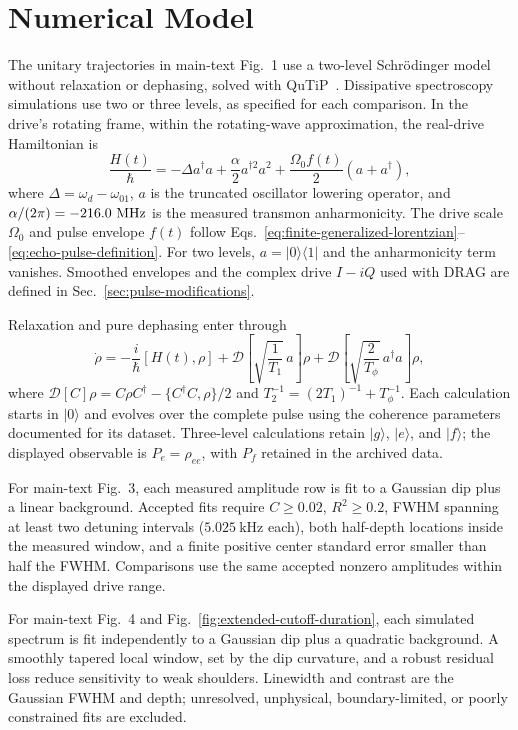 \section{Numerical Model}
\label{sec:numerical-model}

The unitary trajectories in main-text Fig.~1 use a two-level
Schr\"odinger model without relaxation or dephasing, solved with
QuTiP~\cite{johansson_qutip2_2013}. Dissipative spectroscopy simulations
use two or three levels, as specified for each comparison.
In the drive's rotating frame, within the rotating-wave approximation,
the real-drive Hamiltonian is~\cite{PhysRevA.76.042319}
\begin{equation}
    \frac{H(t)}{\hbar}
    = -\Delta a^\dagger a
    + \frac{\alpha}{2}a^{\dagger 2}a^2
    + \frac{\Omega_0 f(t)}{2}(a+a^\dagger),
    \label{eq:numerical-hamiltonian}
\end{equation}
where $\Delta=\omega_d-\omega_{01}$, $a$ is the truncated oscillator
lowering operator, and $\alpha/(2\pi)=-216.0~\mathrm{MHz}$
is the measured transmon anharmonicity. The drive scale $\Omega_0$ and
pulse envelope $f(t)$ follow
Eqs.~\eqref{eq:finite-generalized-lorentzian}--\eqref{eq:echo-pulse-definition}.
For two levels, $a=|0\rangle\langle1|$ and the anharmonicity term vanishes.
Smoothed envelopes and the complex drive $I-iQ$ used with DRAG are defined
in Sec.~\ref{sec:pulse-modifications}.

Relaxation and pure dephasing enter through
\begin{equation}
    \dot{\rho}
    = -\frac{i}{\hbar}[H(t),\rho]
    + \mathcal{D}\!\left[\sqrt{\frac{1}{T_1}}\,a\right]\rho
    + \mathcal{D}\!\left[\sqrt{\frac{2}{T_\phi}}\,
      a^\dagger a\right]\rho,
    \label{eq:numerical-master-equation}
\end{equation}
where $\mathcal{D}[C]\rho=C\rho C^\dagger-
\{C^\dagger C,\rho\}/2$ and
$T_2^{-1}=(2T_1)^{-1}+T_\phi^{-1}$.
Each calculation starts in $|0\rangle$ and evolves over the complete pulse
using the coherence parameters documented for its dataset.
Three-level calculations retain $|g\rangle$, $|e\rangle$, and $|f\rangle$;
the displayed observable is $P_e=\rho_{ee}$, with $P_f$ retained in the
archived data.

For main-text Fig.~3, each measured amplitude row is fit to a Gaussian dip
plus a linear background. Accepted fits require $C\geq0.02$, $R^2\geq0.2$,
FWHM spanning at least two detuning intervals ($5.025~\mathrm{kHz}$ each),
both half-depth locations inside the measured window, and a finite positive
center standard error smaller than half the FWHM. Comparisons use the
same accepted nonzero amplitudes within the displayed drive range.

For main-text Fig.~4 and Fig.~\ref{fig:extended-cutoff-duration}, each simulated
spectrum is fit independently to a Gaussian dip plus a quadratic background.
A smoothly tapered local window, set by the dip curvature, and a robust
residual loss reduce sensitivity to weak shoulders. Linewidth and contrast
are the Gaussian FWHM and depth; unresolved, unphysical, boundary-limited,
or poorly constrained fits are excluded.
